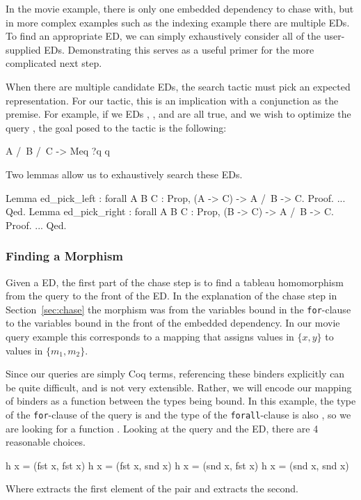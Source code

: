 \documentclass[preprint]{sigplanconf}
\begin{document}
In the movie example, there is only one embedded dependency to chase with, but in more complex examples such as the indexing example there are multiple EDs.
To find an appropriate ED, we can simply exhaustively consider all of the user-supplied EDs.
Demonstrating this serves as a useful primer for the more complicated next step.

When there are multiple candidate EDs, the search tactic must pick an expected representation.
For our tactic, this is an implication with a conjunction as the premise.
For example, if we EDs , , and  are all true, and we wish to optimize the query , the goal posed to the tactic is the following:
\begin{coq}
A /\ B /\ C -> Meq ?q q
\end{coq}

Two lemmas allow us to exhaustively search these EDs.
\begin{coq}
Lemma ed_pick_left : forall {A B C : Prop},
  (A -> C) ->
  A /\ B -> C.
Proof. ... Qed.
Lemma ed_pick_right : forall {A B C : Prop},
  (B -> C) ->
  A /\ B -> C.
Proof. ... Qed.
\end{coq}





\subsubsection{Finding a Morphism}
\label{sec:find-morphism}
Given a ED, the first part of the chase step is to find a tableau homomorphism from the query to the front of the ED.
In the explanation of the chase step in Section~\ref{sec:chase} the morphism was from the variables bound in the {\tt for}-clause to the variables bound in the front of the embedded dependency.
In our movie query example this corresponds to a mapping that assigns values in $\{x,y\}$ to values in $\{m_1,m_2\}$.

Since our queries are simply Coq terms, referencing these binders explicitly can be quite difficult, and is not very extensible.
Rather, we will encode our mapping of binders as a function between the types being bound.
In this example, the type of the {\tt for}-clause of the query is  and the type of the {\tt forall}-clause is also , so we are looking for a function .
Looking at the query and the ED, there are 4 reasonable choices.
\begin{coq}
h x = (fst x, fst x)
h x = (fst x, snd x)
h x = (snd x, fst x)
h x = (snd x, snd x)
\end{coq}
Where  extracts the first element of the pair and  extracts the second.
\end{document}
